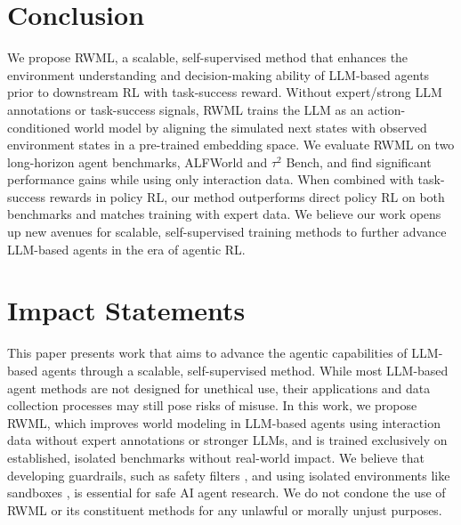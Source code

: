 \documentclass{article}
\theoremstyle{plain}
\theoremstyle{definition}
\theoremstyle{remark}
\newcommand{\shortmethod}[0]{RWML}
\newcommand{\wmrlshort}[0]{\shortmethod}
\begin{document}
\section{Conclusion}
\label{sec:conclusion}
We propose \wmrlshort{}, a scalable, self-supervised method that enhances the environment understanding and decision-making ability of LLM-based agents prior to downstream RL with task-success reward.
Without expert/strong LLM annotations or task-success signals, \wmrlshort{} trains the LLM as an action-conditioned world model by aligning the simulated next states with observed environment states in a pre-trained embedding space.
We evaluate \wmrlshort{} on two long-horizon agent benchmarks, ALFWorld and $\tau^2$ Bench, and find significant performance gains while using only interaction data.
When combined with task-success rewards in policy RL, our method outperforms direct policy RL on both benchmarks and matches training with expert data.
We believe our work opens up new avenues for scalable, self-supervised training methods to further advance LLM-based agents in the era of agentic RL.


\section{Impact Statements}
This paper presents work that aims to advance the agentic capabilities of LLM-based agents through a scalable, self-supervised method.
While most LLM-based agent methods are not designed for unethical use, their applications and data collection processes may still pose risks of misuse.
In this work, we propose \shortmethod{}, which improves world modeling in LLM-based agents using interaction data without expert annotations or stronger LLMs, and is trained exclusively on established, isolated benchmarks without real-world impact.
We believe that developing guardrails, such as safety filters \citep{openai-content-filters,inan2023llamaguardllmbasedinputoutput,luo2025agraillifelongagentguardrail}, and using isolated environments like sandboxes \citep{agentinfrasandbox,pan2025training}, is essential for safe AI agent research.
We do not condone the use of \shortmethod{} or its constituent methods for any unlawful or morally unjust purposes.
\end{document}
